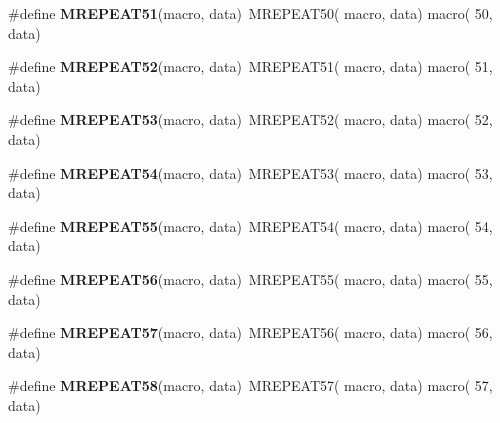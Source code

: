 \begin{DoxyCompactItemize}
\item 
\hypertarget{group__group__xmega__utils__mrepeat_ga6818ebdd66a3249479701fa34a7994e8}{\#define {\bfseries M\-R\-E\-P\-E\-A\-T51}(macro, data)~M\-R\-E\-P\-E\-A\-T50( macro, data)   macro( 50, data)}\label{group__group__xmega__utils__mrepeat_ga6818ebdd66a3249479701fa34a7994e8}

\item 
\hypertarget{group__group__xmega__utils__mrepeat_ga321d36cd49e5f6ca5dc7066e7913e634}{\#define {\bfseries M\-R\-E\-P\-E\-A\-T52}(macro, data)~M\-R\-E\-P\-E\-A\-T51( macro, data)   macro( 51, data)}\label{group__group__xmega__utils__mrepeat_ga321d36cd49e5f6ca5dc7066e7913e634}

\item 
\hypertarget{group__group__xmega__utils__mrepeat_ga89d961bc06d5e1e4f531ee43424c0e98}{\#define {\bfseries M\-R\-E\-P\-E\-A\-T53}(macro, data)~M\-R\-E\-P\-E\-A\-T52( macro, data)   macro( 52, data)}\label{group__group__xmega__utils__mrepeat_ga89d961bc06d5e1e4f531ee43424c0e98}

\item 
\hypertarget{group__group__xmega__utils__mrepeat_ga04d38cb9d863bba593db5c5533234b2b}{\#define {\bfseries M\-R\-E\-P\-E\-A\-T54}(macro, data)~M\-R\-E\-P\-E\-A\-T53( macro, data)   macro( 53, data)}\label{group__group__xmega__utils__mrepeat_ga04d38cb9d863bba593db5c5533234b2b}

\item 
\hypertarget{group__group__xmega__utils__mrepeat_ga43d357d7b292b560fb1a49f4778f56e8}{\#define {\bfseries M\-R\-E\-P\-E\-A\-T55}(macro, data)~M\-R\-E\-P\-E\-A\-T54( macro, data)   macro( 54, data)}\label{group__group__xmega__utils__mrepeat_ga43d357d7b292b560fb1a49f4778f56e8}

\item 
\hypertarget{group__group__xmega__utils__mrepeat_ga1f3c1ef60a18b07755f237d441952d34}{\#define {\bfseries M\-R\-E\-P\-E\-A\-T56}(macro, data)~M\-R\-E\-P\-E\-A\-T55( macro, data)   macro( 55, data)}\label{group__group__xmega__utils__mrepeat_ga1f3c1ef60a18b07755f237d441952d34}

\item 
\hypertarget{group__group__xmega__utils__mrepeat_ga6c79341e638712e4f76cfa03b92acba3}{\#define {\bfseries M\-R\-E\-P\-E\-A\-T57}(macro, data)~M\-R\-E\-P\-E\-A\-T56( macro, data)   macro( 56, data)}\label{group__group__xmega__utils__mrepeat_ga6c79341e638712e4f76cfa03b92acba3}

\item 
\hypertarget{group__group__xmega__utils__mrepeat_ga36b3ee8ed153de1e332867165d8bd129}{\#define {\bfseries M\-R\-E\-P\-E\-A\-T58}(macro, data)~M\-R\-E\-P\-E\-A\-T57( macro, data)   macro( 57, data)}\label{group__group__xmega__utils__mrepeat_ga36b3ee8ed153de1e332867165d8bd129}


\end{DoxyCompactItemize}
